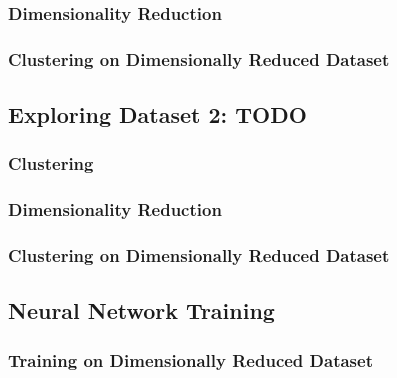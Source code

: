 \documentclass{sig-alternate}
\begin{document}
\subsubsection{Dimensionality Reduction}


\subsubsection{Clustering on Dimensionally Reduced Dataset}


\subsection{Exploring Dataset 2: TODO}

\subsubsection{Clustering}


\subsubsection{Dimensionality Reduction}


\subsubsection{Clustering on Dimensionally Reduced Dataset}



\subsection{Neural Network Training}


\subsubsection{Training on Dimensionally Reduced Dataset}
\end{document}
